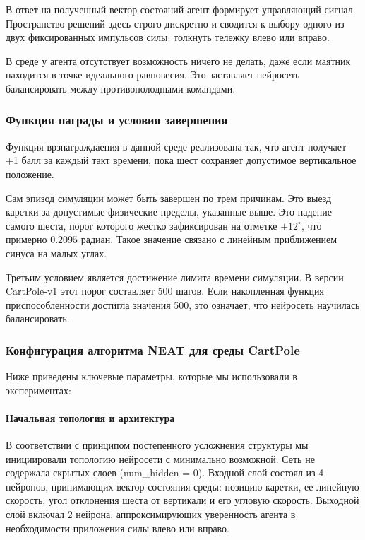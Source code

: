 В ответ на полученный вектор состояний агент формирует управляющий сигнал. Пространство решений здесь строго дискретно и сводится к выбору одного из двух фиксированных импульсов силы: толкнуть тележку влево или вправо.

В среде у агента отсутствует возможность ничего не делать, даже если маятник находится в точке идеального равновесия. Это заставляет нейросеть балансировать между противополодными командами.

\subsubsection{Функция награды и условия завершения}

Функция врзнаграждаения в данной среде реализована так, что агент получает +1 балл за каждый такт времени, пока шест сохраняет допустимое вертикальное положение.

Сам эпизод симуляции может быть завершен по трем причинам. Это выезд каретки за допустимые физические пределы, указанные выше. Это падение самого шеста, порог которого жестко зафиксирован на отметке $\pm12^{\circ}$, что примерно $0.2095$ радиан. Такое значение связано с линейным приближением синуса на малых углах.

Третьим условием является достижение лимита времени симуляции. В версии CartPole-v1 этот порог составляет 500 шагов. Если накопленная функция приспособленности достигла значения 500, это означает, что нейросеть научилась балансировать.

\subsubsection{Конфигурация алгоритма NEAT для среды CartPole}

Ниже приведены ключевые параметры, которые мы использовали в экспериментах:

\paragraph{Начальная топология и архитектура}

В соответствии с принципом постепенного усложнения структуры мы инициировали топологию нейросети с минимально возможной. Сеть не содержала скрытых слоев (num\_hidden = 0). Входной слой состоял из 4 нейронов, принимающих вектор состояния среды: позицию каретки, ее линейную скорость, угол отклонения шеста от вертикали и его угловую скорость. Выходной слой включал 2 нейрона, аппроксимирующих уверенность агента в необходимости приложения силы влево или вправо.

